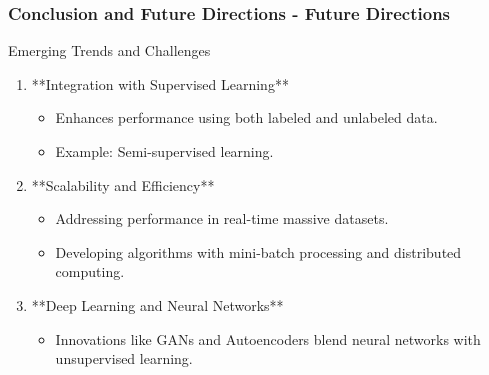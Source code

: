 \documentclass[aspectratio=169]{beamer}
\begin{document}
\begin{frame}[fragile]
    \frametitle{Conclusion and Future Directions - Future Directions}
    \begin{block}{Emerging Trends and Challenges}
        \begin{enumerate}
            \item **Integration with Supervised Learning**
                \begin{itemize}
                    \item Enhances performance using both labeled and unlabeled data.
                    \item Example: Semi-supervised learning.
                \end{itemize}
            \item **Scalability and Efficiency**
                \begin{itemize}
                    \item Addressing performance in real-time massive datasets.
                    \item Developing algorithms with mini-batch processing and distributed computing.
                \end{itemize}
            \item **Deep Learning and Neural Networks**
                \begin{itemize}
                    \item Innovations like GANs and Autoencoders blend neural networks with unsupervised learning.
                \end{itemize}
        \end{enumerate}
    \end{block}
\end{frame}
\end{document}
